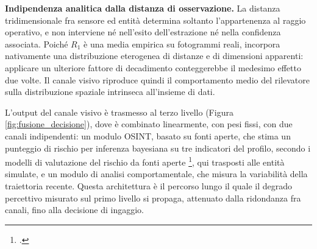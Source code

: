 \ifstampa\documentclass[a4paper,12pt,twoside,openright]{report}\else\documentclass[a4paper,12pt]{report}\fi
\newif\ifrevisione \revisionefalse
\DeclareRobustCommand{\rev}[1]{\ifrevisione{\color{blue!65!black}#1}\else#1\fi}
\begin{document}
\textbf{Indipendenza analitica dalla distanza di osservazione.}
\rev{La distanza tridimensionale fra sensore ed entità determina soltanto
l'appartenenza al raggio operativo, e non interviene né nell'esito
dell'estrazione né nella confidenza associata.} Poiché $R_1$ è una
media empirica su fotogrammi reali, incorpora nativamente una distribuzione
eterogenea di distanze e di dimensioni apparenti: applicare un ulteriore fattore
di decadimento conteggerebbe il medesimo effetto due volte. Il canale visivo
riproduce quindi il comportamento medio del rilevatore sulla distribuzione
spaziale intrinseca all'\rev{insieme di dati}.

L'output del canale visivo è trasmesso al terzo livello (Figura
\ref{fig:fusione_decisione}), dove \rev{è combinato linearmente, con pesi fissi,
con due canali indipendenti: un modulo OSINT, basato su fonti aperte, che
stima un punteggio di rischio per inferenza bayesiana su tre indicatori del
profilo, secondo i modelli di valutazione del rischio da fonti aperte
\footcite{asili_2025_gentprm, gonzalez_2021_etip}, qui trasposti alle entità simulate, e un modulo di analisi
comportamentale, che misura la variabilità della traiettoria recente.} Questa architettura è il percorso lungo il quale il degrado
percettivo misurato sul primo livello si propaga, \rev{attenuato dalla ridondanza
fra canali, fino alla decisione di ingaggio}.
\end{document}
